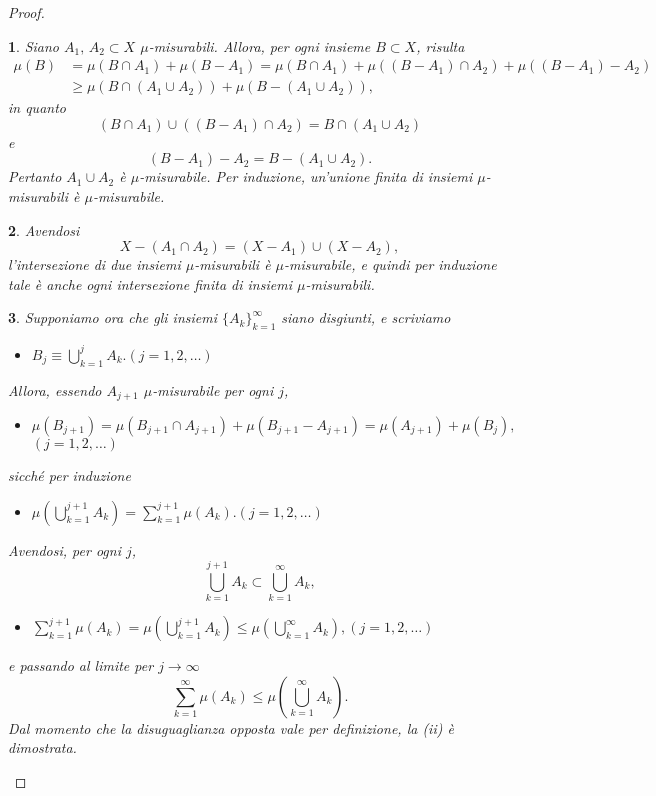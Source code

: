 \documentclass[a4paper,10pt,openright,oneside]{book}
\theoremstyle{theoremstyle}
\theoremstyle{theoremstylewoheader}
\theoremstyle{theoremstyle}
\theoremstyle{proofsecstyle}
\newtheorem{proofsec}{}
\theoremstyle{nonumberplain}
\newtheorem{proof}{Dim.}
\newcommand{\mymath}[2]{\begin{itemize}%
  \item[]\hfill\hbox{}\ensuremath{\displaystyle #1}\hfill\ensuremath{\displaystyle #2}%
  \end{itemize}}
\begin{document}
\begin{proof}
\begin{proofsec}
Siano $A_1,\, A_2 \subset X$ $\mu$-misurabili. Allora, per ogni insieme $B \subset X$, risulta 
\begin{align*}
\mu(B) &= \mu(B \cap A_1) + \mu(B - A_1) = \mu(B \cap A_1) + \mu((B - A_1) \cap A_2) + \mu((B - A_1) - A_2)\\
&\ge \mu(B \cap (A_1 \cup A_2)) + \mu(B - (A_1 \cup A_2)),
\end{align*}
in quanto
\[
(B \cap A_1) \cup ((B - A_1) \cap A_2) = B \cap (A_1 \cup A_2)
\]
e
\[
(B - A_1) - A_2 = B - (A_1 \cup A_2).
\]
Pertanto $A_1 \cup A_2$ è $\mu$-misurabile. Per induzione, un'unione \emph{finita} di insiemi $\mu$-misurabili è $\mu$-misurabile.
\end{proofsec}

\begin{proofsec}
Avendosi
\[
X - (A_1 \cap A_2) = (X - A_1) \cup (X - A_2),
\]
l'intersezione di due insiemi $\mu$-misurabili è $\mu$-misurabile, e quindi per induzione tale è anche ogni intersezione \emph{finita} di insiemi $\mu$-misurabili.
\end{proofsec}

\begin{proofsec}
Supponiamo ora che gli insiemi $\{A_k\}_{k=1}^\infty$ siano disgiunti, e scriviamo \mymath{B_j \equiv \bigcup_{k=1}^j A_k.}{(j = 1, 2, \ldots)}
Allora, essendo $A_{j+1}$ $\mu$-misurabile per ogni $j$, \mymath{\mu(B_{j+1}) = \mu(B_{j+1} \cap A_{j+1}) + \mu(B_{j+1} - A_{j+1}) = \mu(A_{j+1}) + \mu(B_j),}{(j = 1, 2, \ldots)} sicché per induzione \mymath{\mu\left(\bigcup_{k=1}^{j+1} A_k\right) = \sum_{k=1}^{j+1} \mu(A_k).}{(j = 1, 2, \ldots)} Avendosi, per ogni $j$,
\[
\bigcup_{k=1}^{j+1} A_k \subset \bigcup_{k=1}^\infty A_k,
\]
\mymath{\sum_{k=1}^{j+1} \mu(A_k) = \mu\left(\bigcup_{k=1}^{j+1} A_k\right) \le \mu\left(\bigcup_{k=1}^\infty A_k\right),}{(j = 1, 2, \ldots)} e passando al limite per $j \to \infty$
\[
\sum_{k=1}^\infty \mu(A_k) \le \mu\left(\bigcup_{k=1}^\infty A_k\right).
\]
Dal momento che la disuguaglianza opposta vale per definizione, la (ii) è dimostrata.
\end{proofsec}


\end{proof}
\end{document}
